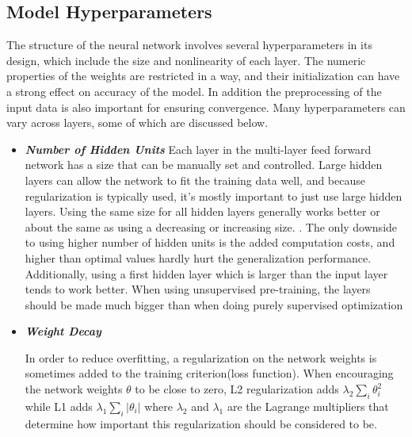 \documentclass[twoside]{article}
\begin{document}
\subsection{ Model Hyperparameters}
The structure of the neural network involves several hyperparameters in its design, which include the size and nonlinearity of each layer. The numeric properties of the weights are restricted in a way, and their initialization can have a strong effect on accuracy of the model. In addition the preprocessing of the input data is also important for ensuring convergence. Many hyperparameters can vary across layers, some of which are discussed below.
\begin{itemize}
\item \textit{\textbf{Number of Hidden Units}}
Each layer in the multi-layer feed forward network has a size that can be manually set and controlled.
Large hidden layers can allow the network to fit the training data well, and because regularization is typically used, it's mostly important to just use large hidden layers. Using the same size for all hidden layers generally works better or about the same as using a decreasing or increasing size. \cite{larochelle2009exploring}. The only downside to using higher number of hidden units is the added computation costs, and higher than optimal values hardly hurt the generalization performance. Additionally, using a first hidden layer which is larger than the input layer tends to work better. When using unsupervised pre-training, the layers should be made much bigger than when doing purely supervised optimization \cite{bengio2012practical}
\item \textit{\textbf{Weight Decay}}

In order to reduce overfitting, a regularization on the network weights is sometimes added to the training criterion(loss function). When encouraging the network weights $\theta$ to be close to zero, L2 regularization adds $\lambda_2 \sum_i \theta_i^2$ while L1 adds $\lambda_1 \sum_i |\theta_i|$ where $\lambda_2$ and $\lambda_1$ are the Lagrange multipliers that determine how important this regularization should be considered to be.\cite{bengio2000gradient}


\end{itemize}
\end{document}
